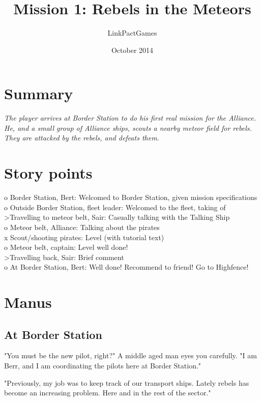\documentclass[a4paper,12pt]{article}
\begin{document}
\title{Mission 1: Rebels in the Meteors}
\author{LinkPactGames}
\date{October 2014}
\maketitle

\section{Summary}
\textit{The player arrives at Border Station to do his first real mission
for the Alliance. He, and a small group of Alliance ships, scouts a nearby meteor field
for rebels. They are attacked by the rebels, and defeats them.}

\section{Story points}

o Border Station, Bert: Welcomed to Border Station, given mission specifications\\
o Outside Border Station, fleet leader: Welcomed to the fleet, taking of\\
\textgreater  Travelling to meteor belt, Sair: Casually talking with the Talking Ship\\
o Meteor belt, Alliance: Talking about the pirates\\
x Scout/shooting pirates: Level (with tutorial text)\\
o Meteor belt, captain: Level well done!\\
\textgreater  Travelling back, Sair: Brief comment\\
o At Border Station, Bert: Well done! Recommend to friend! Go to Highfence!

\section{Manus}

\subsection{At Border Station}

"You must be the new pilot, right?" A middle aged man eyes you carefully.
"I am Berr, and I am coordinating the pilots here at Border Station."

"Previously, my job was to keep track of our transport ships. Lately
rebels has become an increasing problem. Here and in the rest of the sector."
\end{document}
